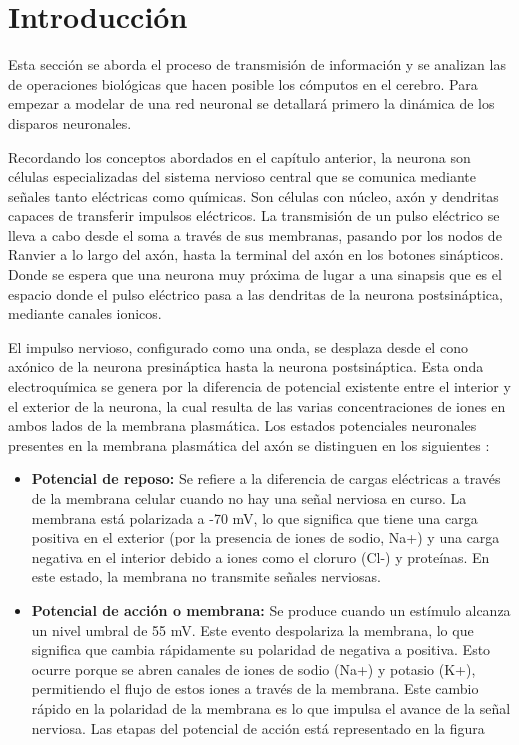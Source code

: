 
\section{Introducción}

Esta sección se aborda el proceso de transmisión de información y se analizan las de operaciones biológicas que hacen posible los cómputos en el cerebro. Para empezar a modelar de una red neuronal se detallará primero la dinámica de los disparos neuronales.

Recordando los conceptos abordados en el  capítulo  anterior, la neurona son células especializadas del sistema nervioso central que se comunica mediante señales tanto eléctricas como químicas.  Son células con núcleo, axón y dendritas capaces de transferir impulsos eléctricos. La transmisión de un pulso eléctrico se lleva a cabo desde el soma a través de sus membranas, pasando por los nodos de Ranvier a lo largo del axón, hasta la terminal del axón en los botones sinápticos. Donde se espera que una neurona muy próxima de lugar a una sinapsis que es el espacio donde el pulso eléctrico pasa a las dendritas de la neurona postsináptica, mediante canales ionicos.\parencite{neurona_A_cerebro}

El impulso nervioso, configurado como una onda, se desplaza  desde el cono axónico de la neurona presináptica hasta la neurona postsináptica. Esta onda electroquímica se genera por la diferencia de potencial existente entre el interior y el exterior de la neurona, la cual resulta de las varias concentraciones de iones en ambos lados de la membrana plasmática. Los estados potenciales neuronales presentes en la membrana plasmática del axón se distinguen en los siguientes \parencite{HH}:

\begin{itemize}
\item \textbf{Potencial de reposo:} Se refiere a la diferencia de cargas eléctricas a través de la membrana celular cuando no hay una señal nerviosa en curso. La membrana está polarizada a -70 mV, lo que significa que tiene una carga positiva en el exterior (por la presencia de iones de sodio, Na+) y una carga negativa en el interior debido a iones como el cloruro (Cl-) y proteínas. En este estado, la membrana no transmite señales nerviosas.

\item \textbf{Potencial de acción o membrana:}  Se produce cuando un estímulo alcanza un nivel umbral de 55 mV. Este evento despolariza la membrana, lo que significa que cambia rápidamente su polaridad de negativa a positiva. Esto ocurre porque se abren canales de iones de sodio (Na+) y potasio (K+), permitiendo el flujo de estos iones a través de la membrana. Este cambio rápido en la polaridad de la membrana es lo que impulsa el avance de la señal nerviosa. Las etapas del potencial de acción está representado en la figura 
\end{itemize}


